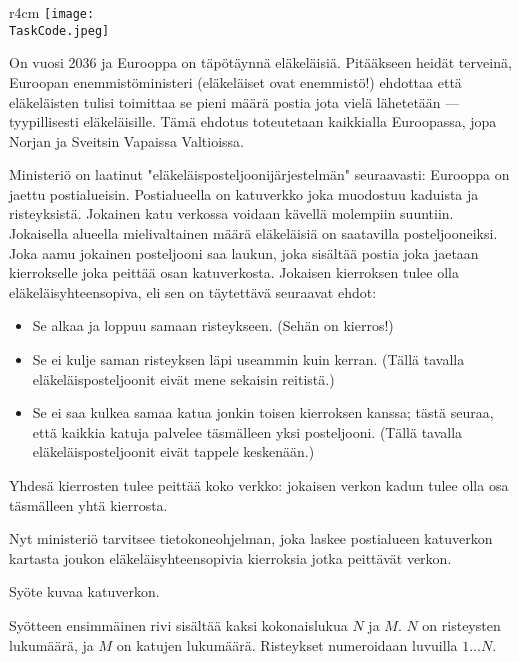 \documentclass{boi2014-fi}
\renewcommand{\TaskCode}{postmen}
\begin{document}
    \begin{wrapfigure}[8]{r}{4cm}
        \vspace{-18pt}
        \texttt{[image: \\TaskCode.jpeg]}
    \end{wrapfigure}
    
    On vuosi 2036 ja Eurooppa on täpötäynnä eläkeläisiä. Pitääkseen
    heidät terveinä, Euroopan enemmistöministeri (eläkeläiset ovat
    enemmistö!) ehdottaa että eläkeläisten tulisi toimittaa se pieni määrä
    postia jota vielä lähetetään --- tyypillisesti eläkeläisille. Tämä ehdotus
    toteutetaan kaikkialla Euroopassa, jopa Norjan ja Sveitsin Vapaissa Valtioissa.
    
    Ministeriö on laatinut "eläkeläisposteljoonijärjestelmän" seuraavasti:
    Eurooppa on jaettu postialueisin. Postialueella on katuverkko joka muodostuu
    kaduista ja risteyksistä. Jokainen katu verkossa voidaan kävellä molempiin 
    suuntiin. Jokaisella alueella mielivaltainen määrä eläkeläisiä on saatavilla
    posteljooneiksi. Joka aamu jokainen posteljooni saa laukun, joka sisältää
    postia joka jaetaan kierrokselle joka peittää osan katuverkosta. Jokaisen
    kierroksen tulee olla eläkeläisyhteensopiva, eli sen on täytettävä seuraavat
    ehdot:
    \begin{itemize}
        \item Se alkaa ja loppuu samaan risteykseen. (Sehän on kierros!)
        \item Se ei kulje saman risteyksen läpi useammin kuin kerran. (Tällä
            tavalla eläkeläisposteljoonit eivät mene sekaisin reitistä.)
        \item Se ei saa kulkea samaa katua jonkin toisen kierroksen kanssa;
            tästä seuraa, että kaikkia katuja palvelee täsmälleen yksi
            posteljooni. (Tällä tavalla eläkeläisposteljoonit eivät tappele
            keskenään.)
    \end{itemize}

    Yhdesä kierrosten tulee peittää koko verkko: jokaisen verkon kadun tulee
    olla osa täsmälleen yhtä kierrosta.

    \Task
    Nyt ministeriö tarvitsee tietokoneohjelman, joka laskee postialueen katuverkon 
    kartasta joukon eläkeläisyhteensopivia kierroksia jotka peittävät verkon.

    \Input
    Syöte kuvaa katuverkon.
    
    Syötteen ensimmäinen rivi sisältää kaksi kokonaislukua $N$ ja $M$. $N$ on
    risteysten lukumäärä, ja $M$ on katujen lukumäärä. Risteykset numeroidaan
    luvuilla $1\ldots N$.
\end{document}
